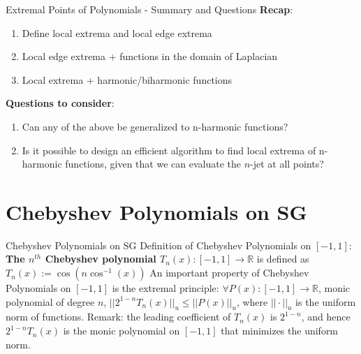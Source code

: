 \documentclass[xcolor = dvipsnames]{beamer}
\begin{document}
\begin{frame}{Extremal Points of Polynomials - Summary and Questions}
    \textbf{Recap}:
    \begin{enumerate}
        \item Define local extrema and local edge extrema
        \item Local edge extrema + functions in the domain of Laplacian
        \item Local extrema + harmonic/biharmonic functions
    \end{enumerate}
    \textbf{Questions to consider}: 
    \begin{enumerate}
        \item Can any of the above be generalized to n-harmonic functions?
        \item Is it possible to design an efficient algorithm to find local extrema of n-harmonic functions, given that we can evaluate the $n$-jet at all points?
    \end{enumerate}
\end{frame}

\section{Chebyshev Polynomials on SG}

\begin{frame}{Chebyshev Polynomials on SG}
    \pause
    Definition of Chebyshev Polynomials on $[-1,1]$: \newline
    \textbf{The $n^{th}$ Chebyshev polynomial $T_{n}(x): [-1, 1] \rightarrow \mathbb{R}$} is defined as \newline
    $T_{n}(x) := \cos(n\cos^{-1}(x))$ \newline \newline
    \pause
    An important property of Chebyshev Polynomials on $[-1,1]$ is the extremal principle: \newline
    $\forall P(x):[-1,1] \rightarrow \mathbb{R}$, monic polynomial of degree $n$, $||2^{1-n}T_{n}(x)||_{u} \leq ||P(x)||_{u}$, where $|| \cdotp ||_{u}$ is the uniform norm of functions. \newline \newline
    \pause
    Remark: the leading coefficient of $T_{n}(x)$ is $2^{1-n}$, and hence $2^{1-n}T_{n}(x)$ is the monic polynomial on $[-1,1]$ that minimizes the uniform norm. \newline \newline
\end{frame}
\end{document}
